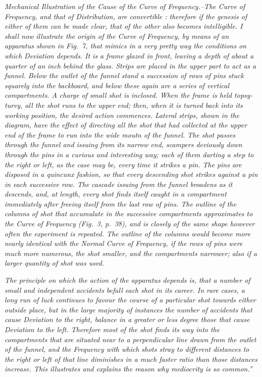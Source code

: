 {\it {\em Mechanical Illustration of the Cause of the Curve of Frequency}.--The Curve of Frequency, and that of Distribution, are convertible : therefore if the genesis of either of them can be made clear, that of the other also becomes intelligible.  I shall now illustrate the origin of the Curve of Frequency, by means of an apparatus shown in Fig.~7, that mimics in a very pretty way the conditions
on which Deviation depends.  It is a frame glazed in front, leaving a depth of about a quarter of an inch behind the glass.  Strips are placed in the upper part to act as a funnel.  Below the outlet of the funnel stand a succession of rows of pins stuck squarely into the backboard, and below these again are a series of vertical compartments.  A charge of small shot is inclosed.  When the frame is held topsy-turvy, all the shot runs to the upper end; then, when it is turned back into its working position, the desired action commences.  Lateral strips, shown in the diagram, have the effect of directing all the shot that had collected at the upper end of the frame to run into the wide moutn of the funnel.  The shot passes through the funnel and issuing from its narrow end, scampers deviously down through the pins in a curious and interesting way; each of them darting a step to the right or left, as the case may be, every time it strikes a pin.  The pins are disposed in a quincunx fashion, so that every descending shot strikes against a pin in each successive row.  The cascade issuing from the funnel broadens as it descends, and, at length, every shot finds itself caught in a compartment immediately after freeing itself from the last row of pins.  The outline of the columns of shot that accumulate in the successive compartments approximates to the Curve of Frequency (Fig.~3, p.~38), and is closely of the same shape however often the experiment is repeated.  The outline of the columns would become more nearly identical with the Normal Curve of Frequency, if the rows of pins were much more numerous, the shot smaller, and the compartments narrower; also if a larger quantity of shot was used.}

{\it The principle on which the action of the apparatus depends is, that a number of small and independent accidents befall each shot in its career.  In rare cases, a long run of luck continues to favour the course of a particular shot towards either outside place, but in the large majority of instances the number of accidents that cause Deviation to the right, balance in a greater or less degree those that cause Deviation to the left.  Therefore most of the shot finds its way into the compartments that are situated near to a perpendicular line drawn from the outlet of the funnel, and the Frequency with which shots stray to different distances to the right or left of that line diminishes in a much faster ratio than those distances increase.  This illustrates and explains the reason why mediocrity is so common.'' }


